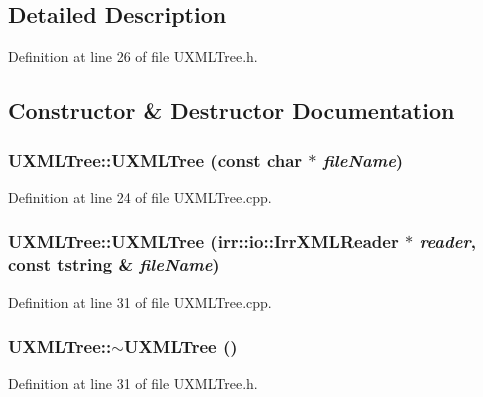 \subsection{Detailed Description}


Definition at line 26 of file UXMLTree.h.

\subsection{Constructor \& Destructor Documentation}
\hypertarget{class_u_x_m_l_tree_43aebc5e4b1221b4989697ea779b802f}{
\subsubsection[{UXMLTree}]{\setlength{\rightskip}{0pt plus 5cm}UXMLTree::UXMLTree (const char $\ast$ {\em fileName})}}
\label{class_u_x_m_l_tree_43aebc5e4b1221b4989697ea779b802f}




Definition at line 24 of file UXMLTree.cpp.\hypertarget{class_u_x_m_l_tree_c8aae9d2fa6a1c6fc60a5ae2a7d8211f}{
\subsubsection[{UXMLTree}]{\setlength{\rightskip}{0pt plus 5cm}UXMLTree::UXMLTree ({\bf irr::io::IrrXMLReader} $\ast$ {\em reader}, \/  const {\bf tstring} \& {\em fileName})}}
\label{class_u_x_m_l_tree_c8aae9d2fa6a1c6fc60a5ae2a7d8211f}




Definition at line 31 of file UXMLTree.cpp.\hypertarget{class_u_x_m_l_tree_db9c9722b57e6c62f805f6c922000c01}{
\subsubsection[{$\sim$UXMLTree}]{\setlength{\rightskip}{0pt plus 5cm}UXMLTree::$\sim$UXMLTree ()}}
\label{class_u_x_m_l_tree_db9c9722b57e6c62f805f6c922000c01}




Definition at line 31 of file UXMLTree.h.

